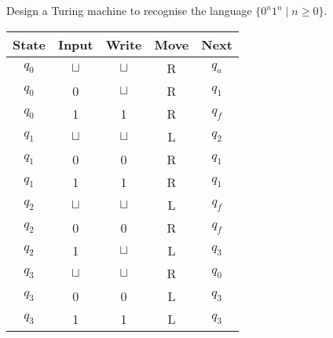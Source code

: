 \documentclass[a4paper, 12pt]{exam}
\begin{document}
\begin{questions}
\question
  Design a Turing machine to recognise the language $\{ 0^n 1^n \mid n \geq 0 \}$.
  \begin{solution}
    \begin{table}[H]
      \centering
      \begin{tabular}{ccccc}
        \toprule
            State & Input & Write & Move & Next \\
        \midrule
            $q_0$ & $\sqcup$ & $\sqcup$ & R & $q_a$ \\
            $q_0$ & 0        & $\sqcup$ & R & $q_1$ \\
            $q_0$ & 1        & 1        & R & $q_f$ \\
        \midrule
            $q_1$ & $\sqcup$ & $\sqcup$ & L & $q_2$ \\
            $q_1$ & 0        & 0        & R & $q_1$ \\
            $q_1$ & 1        & 1        & R & $q_1$ \\
        \midrule
            $q_2$ & $\sqcup$ & $\sqcup$ & L & $q_f$ \\
            $q_2$ & 0        & 0        & R & $q_f$ \\
            $q_2$ & 1        & $\sqcup$ & L & $q_3$ \\
        \midrule
            $q_3$ & $\sqcup$ & $\sqcup$ & R & $q_0$ \\
            $q_3$ & 0        & 0        & L & $q_3$ \\
            $q_3$ & 1        & 1        & L & $q_3$ \\
        \bottomrule
        \hline
      \end{tabular}
    \end{table}
  \end{solution}



\end{questions}
\end{document}
